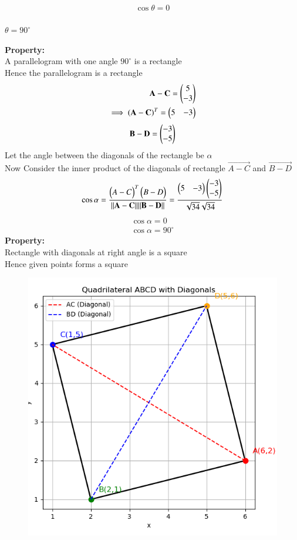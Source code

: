 \documentclass[journal,12pt,onecolumn]{IEEEtran}
\begin{document}
      \begin{align}
          \cos{\theta}=0\\
      \end{align}
      \begin{center}
      $\theta=90^\circ$
      \end{center}
      \textbf{Property:}\\
      A parallelogram with one angle $90^\circ$ is a rectangle\\
      Hence the parallelogram is a rectangle\\
      \begin{align}
      \mathbf{A-C}=\begin{pmatrix}5\\-3\end{pmatrix}\\
      \implies \mathbf{(A-C)}^T=\begin{pmatrix}5 & -3\end{pmatrix}
      \end{align}
      \begin{align}
          \mathbf{B-D}=\begin{pmatrix}-3\\-5\end{pmatrix}
      \end{align}
      Let the angle between the diagonals of the rectangle be $\alpha$\\
      Now Consider the inner product of the diagonals of rectangle $\vec{A-C}$ and $\vec{B-D}$ \\
      \begin{align}
      \cos{\alpha}=\frac{\begin{pmatrix}A-C\end{pmatrix}^T\begin{pmatrix}B-D\end{pmatrix}}{\|\mathbf{A-C}\|\|\mathbf{B-D}\|}=\frac{\begin{pmatrix}5&-3\end{pmatrix}\begin{pmatrix}-3\\-5\end{pmatrix}}{\sqrt{34}\sqrt{34}}
      \end{align}
      \begin{align}
          \cos{\alpha}=0\\
          \cos{\alpha}=90^\circ
      \end{align}
      \textbf{Property:}\\
      Rectangle with diagonals at right angle is a square\\
      Hence given points forms a square\\
      \begin{figure}[H]
          \centering
          \includegraphics[width=0.7\linewidth]{figs/fig1.png}
	      \caption{}
	      \label{fig}
      \end{figure}
\end{document}
